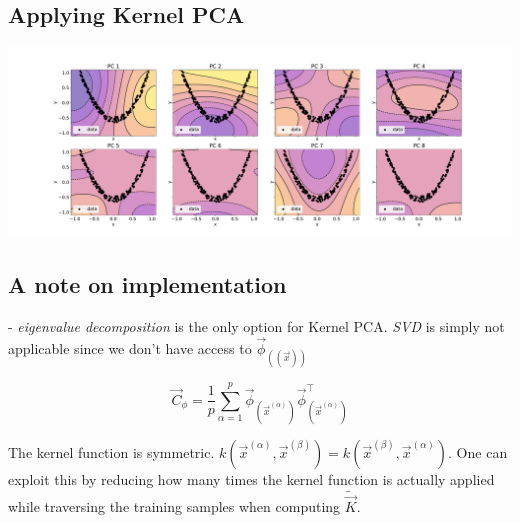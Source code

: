 

\subsection{Applying Kernel PCA}

\begin{frame}{\subsecname}


\begin{center}
	\includegraphics[height=5cm]{img/contourplot_kpca_rbf}
\end{center}

\end{frame}

\subsection{A note on implementation}

\begin{frame}{\subsecname}



\pause

- \emph{eigenvalue decomposition} is the only option for Kernel PCA. \emph{SVD} is simply not applicable since we don't have access to $\vec \phi_{((\vec x))}$

\begin{equation}
\vec C_{\phi} = \frac{1}{p} \sum_{\alpha=1}^{p} \vec{\phi}_{(\vec{x}^{(\alpha)})} \vec{\phi}^{\top}_{(\vec{x}^{(\alpha)})}
\end{equation}

\end{frame}

\begin{frame}{\subsecname}


\pause

The kernel function is symmetric. $k(\vec x^{(\alpha)}, \vec x^{(\beta)}) = k(\vec x^{(\beta)}, \vec x^{(\alpha)})$. One can exploit this by reducing how many times the kernel function is actually applied while traversing the training samples when computing $\widetilde {\vec{K}}$.

\end{frame}
